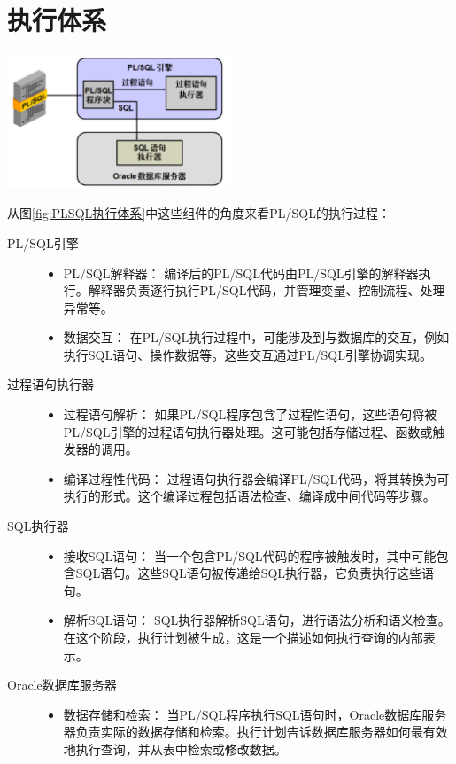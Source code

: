\documentclass[11pt, a4paper, oneside, UTF8]{ctexbook}
\begin{document}
\section{执行体系}
\begin{center}
  \begin{minipage}{\textwidth}
    \center
    \includegraphics[width=0.5\textwidth]{picture/PLSQL执行体系.png}
    \captionsetup{hypcap=false}
    \label{fig:PLSQL执行体系}
  \end{minipage}
\end{center}
从图\ref{fig:PLSQL执行体系}中这些组件的角度来看PL/SQL的执行过程：
\begin{description}
  \item[PL/SQL引擎] \hfill
    \begin{itemize}
      \item PL/SQL解释器： 编译后的PL/SQL代码由PL/SQL引擎的解释器执行。解释器负责逐行执行PL/SQL代码，并管理变量、控制流程、处理异常等。
      \item 数据交互： 在PL/SQL执行过程中，可能涉及到与数据库的交互，例如执行SQL语句、操作数据等。这些交互通过PL/SQL引擎协调实现。
    \end{itemize}
  \item[过程语句执行器] \hfill
    \begin{itemize}
      \item 过程语句解析： 如果PL/SQL程序包含了过程性语句，这些语句将被PL/SQL引擎的过程语句执行器处理。这可能包括存储过程、函数或触发器的调用。
      \item 编译过程性代码： 过程语句执行器会编译PL/SQL代码，将其转换为可执行的形式。这个编译过程包括语法检查、编译成中间代码等步骤。
    \end{itemize}
  \item[SQL执行器]  \hfill
    \begin{itemize}
      \item 接收SQL语句： 当一个包含PL/SQL代码的程序被触发时，其中可能包含SQL语句。这些SQL语句被传递给SQL执行器，它负责执行这些语句。
      \item 解析SQL语句： SQL执行器解析SQL语句，进行语法分析和语义检查。在这个阶段，执行计划被生成，这是一个描述如何执行查询的内部表示。
    \end{itemize}
  \item[Oracle数据库服务器] \hfill
    \begin{itemize}
      \item 数据存储和检索： 当PL/SQL程序执行SQL语句时，Oracle数据库服务器负责实际的数据存储和检索。执行计划告诉数据库服务器如何最有效地执行查询，并从表中检索或修改数据。
    \end{itemize}
\end{description}
\end{document}
